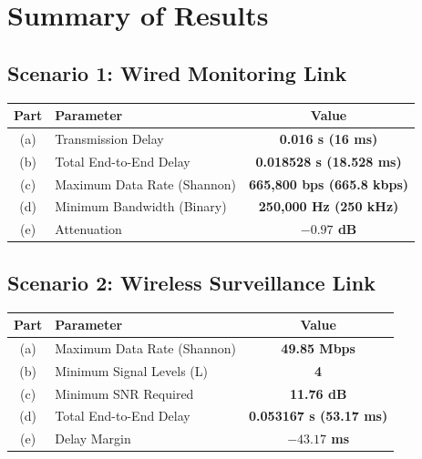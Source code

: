 \documentclass[12pt,a4paper]{article}
\begin{document}
\newpage

\section{Summary of Results}

\subsection{Scenario 1: Wired Monitoring Link}

\begin{table}[h]
\centering
\begin{tabular}{clc}
\toprule
\textbf{Part} & \textbf{Parameter} & \textbf{Value} \\
\midrule
(a) & Transmission Delay & \textbf{0.016 s (16 ms)} \\
(b) & Total End-to-End Delay & \textbf{0.018528 s (18.528 ms)} \\
(c) & Maximum Data Rate (Shannon) & \textbf{665,800 bps (665.8 kbps)} \\
(d) & Minimum Bandwidth (Binary) & \textbf{250,000 Hz (250 kHz)} \\
(e) & Attenuation & \textbf{$-0.97$ dB} \\
\bottomrule
\end{tabular}
\end{table}

\subsection{Scenario 2: Wireless Surveillance Link}

\begin{table}[h]
\centering
\begin{tabular}{clc}
\toprule
\textbf{Part} & \textbf{Parameter} & \textbf{Value} \\
\midrule
(a) & Maximum Data Rate (Shannon) & \textbf{49.85 Mbps} \\
(b) & Minimum Signal Levels (L) & \textbf{4} \\
(c) & Minimum SNR Required & \textbf{11.76 dB} \\
(d) & Total End-to-End Delay & \textbf{0.053167 s (53.17 ms)} \\
(e) & Delay Margin & \textbf{$-43.17$ ms} \\
\bottomrule
\end{tabular}
\end{table}
\end{document}
